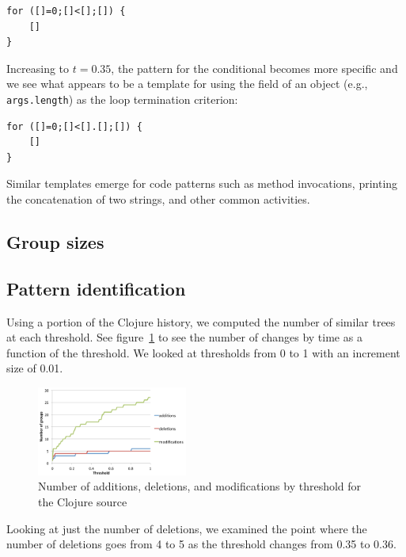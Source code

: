 \begin{verbatim}
for ([]=0;[]<[];[]) {
    []
}
\end{verbatim}

Increasing to $t=0.35$, the pattern for the conditional becomes more specific
and we see what appears to be a template for using the field of an object
(e.g., {\tt args.length}) as the loop termination criterion:

\begin{verbatim}
for ([]=0;[]<[].[];[]) {
    []
}
\end{verbatim}

Similar templates emerge for code patterns such as method invocations, printing
the concatenation of two strings, and other common activities.  

\subsection{Group sizes}

\subsection{Pattern identification}

Using a portion of the Clojure history, we computed the number of similar trees
at each threshold. See figure~\ref{fig:clojure-number-of-modifications} to see
the number of changes by time as a function of the threshold. We looked at
thresholds from 0 to 1 with an increment size of 0.01.

\begin{figure}
\begin{center}
\includegraphics[width=0.44\textwidth]{figures/clojure-number-of-modifications.pdf}
\caption{Number of additions, deletions, and modifications by threshold for the Clojure source}
\label{fig:clojure-number-of-modifications}
\end{center}
\end{figure}

Looking at just the number of deletions, we examined the point where the number
of deletions goes from 4 to 5 as the threshold changes from 0.35 to 0.36.

